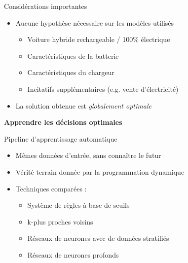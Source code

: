 \documentclass[french]{beamer}
\begin{document}
{ \begin{frame}{Considérations importantes}
 \begin{itemize}
 	\item Aucune hypothèse nécessaire sur les modèles utilisés
 	\begin{itemize}
 		\item Voiture hybride rechargeable / 100\% électrique
 		\item Caractéristiques de la batterie
 		\item Caractéristiques du chargeur
 		\item Incitatifs supplémentaires (e.g. vente d'électricité)
 	\end{itemize}
 	\item La solution obtenue est \emph{globalement optimale}
 \end{itemize}
 \end{frame}
 
 

{
\begin{frame}
\begin{center}
\huge \textbf{Apprendre les décisions optimales}
\end{center}
\end{frame}
}
\addtocounter{framenumber}{-1}

\begin{frame}{Pipeline d'apprentissage automatique}
\begin{itemize}
	\item Mêmes données d'entrée, sans connaître le futur
	\item Vérité terrain donnée par la programmation dynamique
	\item Techniques comparées :
	\begin{itemize}
		\item Système de règles à base de seuils
		\item k-plus proches voisins
		\item Réseaux de neurones avec de données stratifiés
		 \item Réseaux de neurones profonds
 
	\end{itemize}
\end{itemize}

\end{frame}


}
\end{document}

